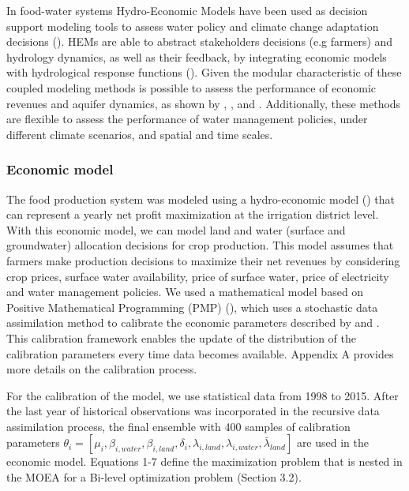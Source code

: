 \documentclass[11pt,a4paper]{article}
\begin{document}
In food-water systems Hydro-Economic Models have been used as decision support modeling tools to assess water policy and climate change adaptation decisions (\cite{ward_hydroeconomic_2021,harou_hydro-economic_2009}). HEMs are able to abstract stakeholders decisions (e.g farmers) and hydrology dynamics, as well as their feedback, by integrating economic models with hydrological response functions (\cite{harou_hydro-economic_2009}). Given the modular characteristic of these coupled modeling methods is possible to assess the performance of economic revenues and aquifer dynamics, as shown by \textcite{macewan_hydroeconomic_2017}, \textcite{afshar_multi-objective_2020}, \textcite{rodriguez-flores_global_2022} and \textcite{graveline_combining_2020}. Additionally, these methods are flexible to assess the performance of water management policies, under different climate scenarios, and spatial and time scales.

\subsubsection{Economic model}

The food production system was modeled using a hydro-economic model (\cite{harou_hydro-economic_2009}) that can represent a yearly net profit maximization at the irrigation district level. With this economic model, we can model land and water (surface and groundwater) allocation decisions for crop production. This model assumes that farmers make production decisions to maximize their net revenues by considering crop prices, surface water availability, price of surface water, price of electricity and water management policies. We used a mathematical model based on Positive Mathematical Programming (PMP) (\cite{howitt_calibration_1995}), which uses a stochastic data assimilation method to calibrate the economic parameters described by \textcite{maneta_stochastic_2014} and \textcite{maneta_satellite-driven_2020}. This calibration framework enables the update of the distribution of the calibration parameters every time data becomes available. Appendix A provides more details on the calibration process. 

For the calibration of the model, we use statistical data from 1998 to 2015. After the last year of historical observations was incorporated in the recursive data assimilation process, the final ensemble with 400 samples of calibration parameters $\theta_{i} = [\mu_{i},\beta_{i,water},\beta_{i,land},\delta_{i},\lambda_{i,land},\lambda_{i,water},\bar{\lambda}_{land}]$ are used in the economic model. Equations 1-7 define the maximization problem that is nested in the MOEA for a Bi-level optimization problem (Section 3.2).
\end{document}
